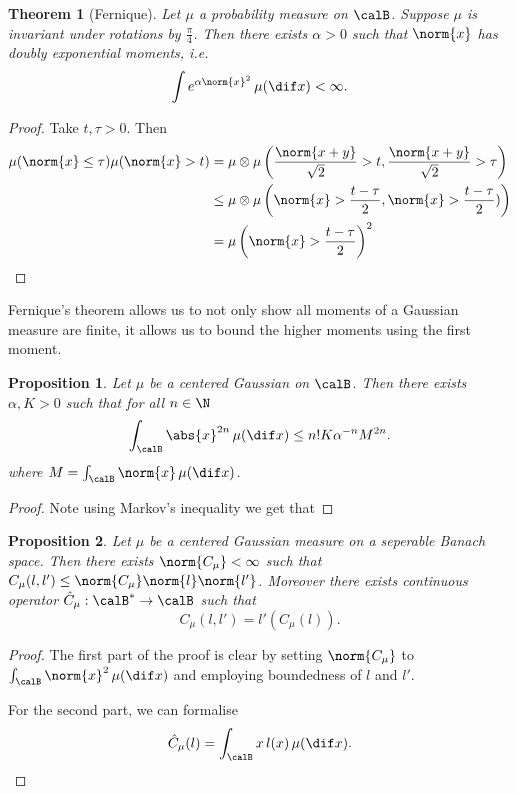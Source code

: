 \documentclass[fontsize=12pt, DIV=10]{scrreprt}
\theoremstyle{mydefn}
\newtheorem{theorem}{Theorem}
\newtheorem{prop}{Proposition}
\theoremstyle{remark}
\begin{document}
\begin{theorem}[Fernique]
	Let $\mu$ a probability measure on $\calB$. Suppose $\mu$ is invariant under rotations by $\frac{\pi}{4}$. Then there exists $\alpha > 0$ such that $\norm{x}$ has doubly exponential moments, i.e.\
	\begin{equation}
		\int e^{\alpha \norm{x}^2} \, \mu(\dif x) < \infty.
	\end{equation}
\end{theorem}
\begin{proof}
	Take $t, \tau > 0$. Then
	\begin{align}
		\mu(\norm{x} \leq \tau) \mu(\norm{x} > t)
		&= \mu \otimes \mu\left( \frac{\norm{x + y}}{\sqrt{2}} > t, \frac{\norm{x+y}}{\sqrt{2}} > \tau \right) \\
		&\leq \mu \otimes \mu \left(\norm{x} > \frac{t - \tau}{2}, \norm{x} > \frac{t - \tau}{2}) \right) \\
		&= \mu\left(\norm{x} > \frac{t - \tau}{2}\right)^2
	\end{align}
\end{proof}

Fernique's theorem allows us to not only show all moments of a Gaussian measure are finite, it allows us to bound the higher moments using the first moment.

\begin{prop}
	Let $\mu$ be a centered Gaussian on $\calB$. Then there exists $\alpha, K > 0$ such that for all $n \in \N$
	\begin{equation}
		\int_{\calB} \abs{x}^{2n} \, \mu(\dif x) \leq n! K \alpha^{-n} M^{2n}.
	\end{equation}
	where $M = \int_{\calB} \norm{x} \, \mu(\dif x)$.
\end{prop}
\begin{proof}
	Note using Markov's inequality we get that
\end{proof}

\begin{prop}
	\label{prop:bounded-cov}
	Let $\mu$ be a centered Gaussian measure on a seperable Banach space. Then there exists $\norm{C_{\mu}} < \infty$ such that $C_{\mu}(l, l') \leq \norm{C_{\mu}} \norm{l} \norm{l'}$. Moreover there exists continuous operator $\hat{C}_{\mu}: \calB^* \to \calB$ such that
	\begin{equation}
		C_{\mu}(l, l') = l'\left(C_{\mu}(l) \right).
	\end{equation}
\end{prop}
\begin{proof}
	The first part of the proof is clear by setting $\norm{C_{\mu}}$ to $\int_{\calB} \norm{x}^2 \, \mu(\dif x)$ and employing boundedness of $l$ and $l'$.

	For the second part, we can formalise
	\begin{equation}
		\hat{C}_{\mu}(l) = \int_{\calB} x \, l(x) \, \mu(\dif x).
	\end{equation}
\end{proof}
\end{document}
